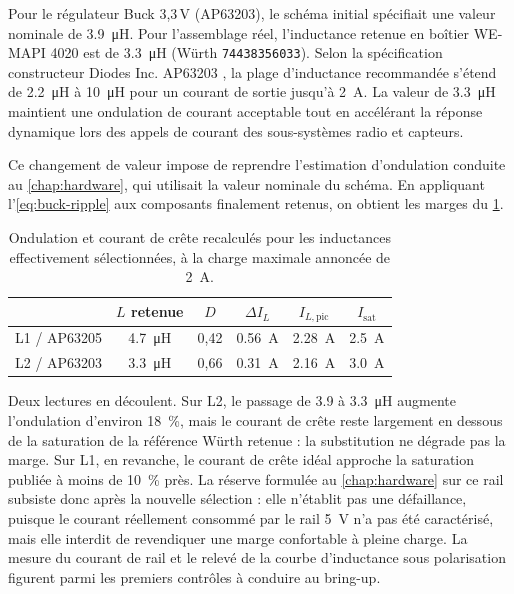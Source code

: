 Pour le régulateur Buck 3,3\,V (AP63203), le schéma initial spécifiait une valeur nominale de \SI{3.9}{\micro\henry}. Pour l'assemblage réel, l'inductance retenue en boîtier WE-MAPI 4020 est de \SI{3.3}{\micro\henry} (Würth \texttt{74438356033}). Selon la spécification constructeur Diodes Inc. AP63203 \cite{diodes-ap6320x}, la plage d'inductance recommandée s'étend de \SI{2.2}{\micro\henry} à \SI{10}{\micro\henry} pour un courant de sortie jusqu'à \SI{2}{\ampere}. La valeur de \SI{3.3}{\micro\henry} maintient une ondulation de courant acceptable tout en accélérant la réponse dynamique lors des appels de courant des sous-systèmes radio et capteurs.

Ce changement de valeur impose de reprendre l'estimation d'ondulation conduite au \cref{chap:hardware}, qui utilisait la valeur nominale du schéma. En appliquant l'\cref{eq:buck-ripple} aux composants finalement retenus, on obtient les marges du \cref{tab:inductors-margins}.

\begin{table}[H]
  \centering
  \small
  \caption{Ondulation et courant de crête recalculés pour les inductances effectivement sélectionnées, à la charge maximale annoncée de \SI{2}{\ampere}.}
  \label{tab:inductors-margins}
  \begin{tabular}{@{}lccccc@{}}
    \toprule
    & $L$ retenue & $D$ & $\Delta I_L$ & $I_{L,\mathrm{pic}}$ & $I_{\mathrm{sat}}$ \\
    \midrule
    L1 / AP63205 & \SI{4.7}{\micro\henry} & 0,42 & \SI{0.56}{\ampere} & \SI{2.28}{\ampere} & \SI{2.5}{\ampere} \\
    L2 / AP63203 & \SI{3.3}{\micro\henry} & 0,66 & \SI{0.31}{\ampere} & \SI{2.16}{\ampere} & \SI{3.0}{\ampere} \\
    \bottomrule
  \end{tabular}
\end{table}

Deux lectures en découlent. Sur L2, le passage de \SI{3.9}{} à \SI{3.3}{\micro\henry} augmente l'ondulation d'environ \SI{18}{\percent}, mais le courant de crête reste largement en dessous de la saturation de la référence Würth retenue : la substitution ne dégrade pas la marge. Sur L1, en revanche, le courant de crête idéal approche la saturation publiée à moins de \SI{10}{\percent} près. La réserve formulée au \cref{chap:hardware} sur ce rail subsiste donc après la nouvelle sélection : elle n'établit pas une défaillance, puisque le courant réellement consommé par le rail \SI{5}{\volt} n'a pas été caractérisé, mais elle interdit de revendiquer une marge confortable à pleine charge. La mesure du courant de rail et le relevé de la courbe d'inductance sous polarisation figurent parmi les premiers contrôles à conduire au bring-up.

